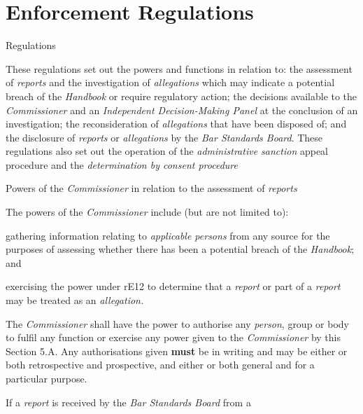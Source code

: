 \part{Enforcement Regulations}


Regulations


These regulations set out the powers and functions in relation to: the
assessment of \emph{reports} and the investigation
of \emph{allegations} which may indicate a potential breach of
the \emph{Handbook} or require regulatory action; the decisions
available to the \emph{Commissioner }and an\emph{ Independent
Decision-Making Panel }at the conclusion of an investigation; the
reconsideration of \emph{allegations} that have been disposed of; and
the disclosure of \emph{reports} or \emph{allegations} by the \emph{Bar
Standards Board}. These regulations also set out the operation of
the \emph{administrative sanction }appeal procedure and
the \emph{determination by consent procedure}\par
{}\par
Powers of the \emph{Commissioner} in relation to the assessment
of \emph{reports}\par
{}\par
The powers of the \emph{Commissioner} include (but are not limited
to):\\\nl \item gathering information relating to \emph{applicable persons} from any
source for the purposes of assessing whether there has been a potential
breach of the \emph{Handbook}; and\item exercising the power under rE12 to determine that a \emph{report} or
part of a \emph{report} may be treated as an \emph{allegation.}\ln
{}\par
The \emph{Commissioner} shall have the power to authorise
any \emph{person}, group or body to fulfil any function or exercise any
power given to the \emph{Commissioner} by this Section 5.A. Any
authorisations given  \textcolor{myred}{\textbf{must}} be in writing and may be either or both
retrospective and prospective, and either or both general and for a
particular purpose.\\
\par
{}\par
If a \emph{report} is received by the \emph{Bar Standards Board} from a
